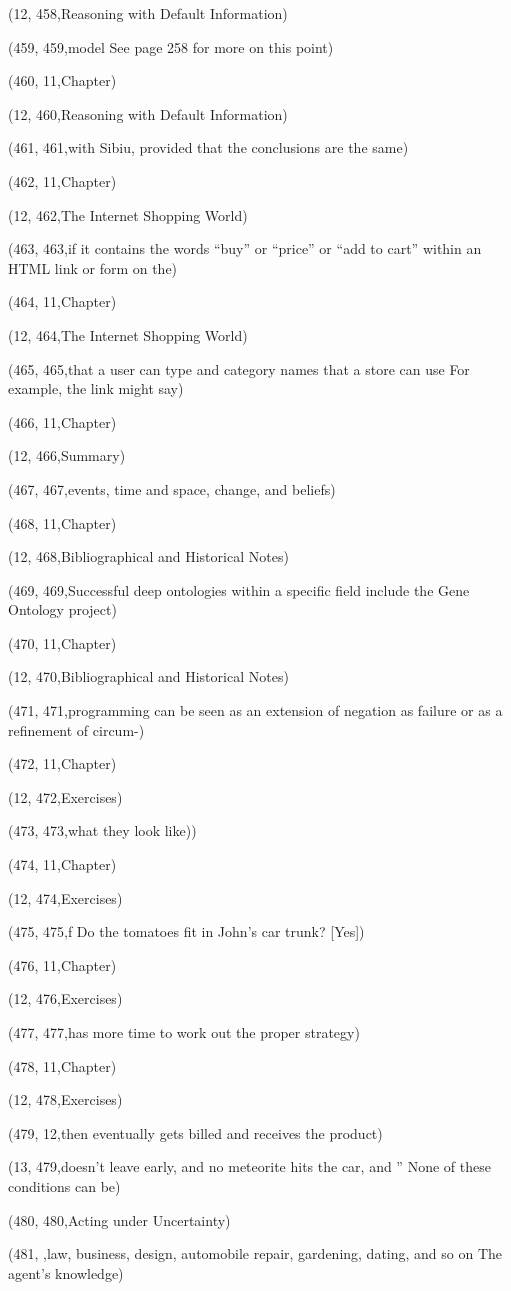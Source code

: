 (12, 458,Reasoning with Default Information)

(459, 459,model See page 258 for more on this point)

(460, 11,Chapter)

(12, 460,Reasoning with Default Information)

(461, 461,with Sibiu, provided that the conclusions are the same)

(462, 11,Chapter)

(12, 462,The Internet Shopping World)

(463, 463,if it contains the words “buy” or “price” or “add to cart” within an HTML link or form on the)

(464, 11,Chapter)

(12, 464,The Internet Shopping World)

(465, 465,that a user can type and category names that a store can use For example, the link might say)

(466, 11,Chapter)

(12, 466,Summary)

(467, 467,events, time and space, change, and beliefs)

(468, 11,Chapter)

(12, 468,Bibliographical and Historical Notes)

(469, 469,Successful deep ontologies within a speciﬁc ﬁeld include the Gene Ontology project)

(470, 11,Chapter)

(12, 470,Bibliographical and Historical Notes)

(471, 471,programming can be seen as an extension of negation as failure or as a reﬁnement of circum-)

(472, 11,Chapter)

(12, 472,Exercises)

(473, 473,what they look like))

(474, 11,Chapter)

(12, 474,Exercises)

(475, 475,f Do the tomatoes ﬁt in John’s car trunk? [Yes])

(476, 11,Chapter)

(12, 476,Exercises)

(477, 477,has more time to work out the proper strategy)

(478, 11,Chapter)

(12, 478,Exercises)

(479, 12,then eventually gets billed and receives the product)

(13, 479,doesn’t leave early, and no meteorite hits the car, and    ” None of these conditions can be)

(480, 480,Acting under Uncertainty)

(481, ,law, business, design, automobile repair, gardening, dating, and so on The agent’s knowledge)

